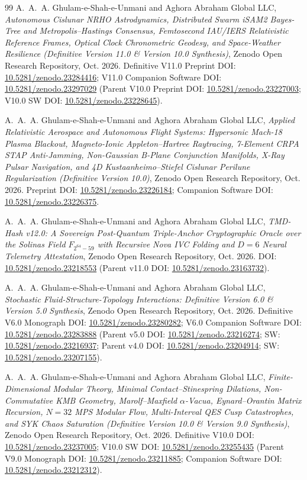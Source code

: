 \documentclass[11pt,a4paper,reqno]{article}
\def\texttt#1{#1}%
\def\mathbb#1{#1}%
\newcommand{\zenodo}[1]{\href{https://doi.org/10.5281/zenodo.#1}{\texttt{10.5281/\allowbreak zenodo.#1}}}
\theoremstyle{plain}
\theoremstyle{definition}
\theoremstyle{remark}
\numberwithin{equation}{section}
\begin{document}
\begin{thebibliography}{99}
A.~A.~A. Ghulam-e-Shah-e-Unmani and {Aghora Abraham Global LLC},
\emph{Autonomous Cislunar NRHO Astrodynamics, Distributed Swarm iSAM2 Bayes-Tree and Metropolis--Hastings Consensus, Femtosecond IAU/IERS Relativistic Reference Frames, Optical Clock Chronometric Geodesy, and Space-Weather Resilience (Definitive Version 11.0 \& Version 10.0 Synthesis)},
Zenodo Open Research Repository, Oct. 2026.
Definitive V11.0 Preprint DOI: \zenodo{23284416}; V11.0 Companion Software DOI: \zenodo{23297029} (Parent V10.0 Preprint DOI: \zenodo{23227003}; V10.0 SW DOI: \zenodo{23228645}).

A.~A.~A. Ghulam-e-Shah-e-Unmani and {Aghora Abraham Global LLC},
\emph{Applied Relativistic Aerospace and Autonomous Flight Systems: Hypersonic Mach-18 Plasma Blackout, Magneto-Ionic Appleton--Hartree Raytracing, 7-Element CRPA STAP Anti-Jamming, Non-Gaussian B-Plane Conjunction Manifolds, X-Ray Pulsar Navigation, and 4D Kustaanheimo--Stiefel Cislunar Perilune Regularization (Definitive Version 10.0)},
Zenodo Open Research Repository, Oct. 2026.
Preprint DOI: \zenodo{23226184}; Companion Software DOI: \zenodo{23226375}.

A.~A.~A. Ghulam-e-Shah-e-Unmani and {Aghora Abraham Global LLC},
\emph{TMD-Hash v12.0: A Sovereign Post-Quantum Triple-Anchor Cryptographic Oracle over the Solinas Field $\mathbb{F}_{2^{64}-59}$ with Recursive Nova IVC Folding and $D=6$ Neural Telemetry Attestation},
Zenodo Open Research Repository, Oct. 2026.
DOI: \zenodo{23218553} (Parent v11.0 DOI: \zenodo{23163732}).

A.~A.~A. Ghulam-e-Shah-e-Unmani and {Aghora Abraham Global LLC},
\emph{Stochastic Fluid-Structure-Topology Interactions: Definitive Version 6.0 \& Version 5.0 Synthesis},
Zenodo Open Research Repository, Oct. 2026.
Definitive V6.0 Monograph DOI: \zenodo{23280282}; V6.0 Companion Software DOI: \zenodo{23283888} (Parent v5.0 DOI: \zenodo{23216274}; SW: \zenodo{23216937}; Parent v4.0 DOI: \zenodo{23204914}; SW: \zenodo{23207155}).

A.~A.~A. Ghulam-e-Shah-e-Unmani and {Aghora Abraham Global LLC},
\emph{Finite-Dimensional Modular Theory, Minimal Contact--Stinespring Dilations, Non-Commutative KMB Geometry, Marolf--Maxfield $\alpha$-Vacua, Eynard--Orantin Matrix Recursion, $N=32$ MPS Modular Flow, Multi-Interval QES Cusp Catastrophes, and SYK Chaos Saturation (Definitive Version 10.0 \& Version 9.0 Synthesis)},
Zenodo Open Research Repository, Oct. 2026.
Definitive V10.0 DOI: \zenodo{23237005}; V10.0 SW DOI: \zenodo{23255435} (Parent V9.0 Monograph DOI: \zenodo{23211885}; Companion Software DOI: \zenodo{23212312}).


\end{thebibliography}
\end{document}
